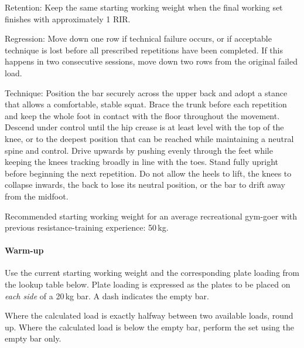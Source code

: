 \documentclass[11pt,a4paper]{article}
\begin{document}
Retention: Keep the same starting working weight when the final working set finishes with approximately 1 RIR.

Regression: Move down one row if technical failure occurs, or if acceptable technique is lost before all prescribed repetitions have been completed. If this happens in two consecutive sessions, move down two rows from the original failed load.

Technique: Position the bar securely across the upper back and adopt a stance that allows a comfortable, stable squat. Brace the trunk before each repetition and keep the whole foot in contact with the floor throughout the movement. Descend under control until the hip crease is at least level with the top of the knee, or to the deepest position that can be reached while maintaining a neutral spine and control. Drive upwards by pushing evenly through the feet while keeping the knees tracking broadly in line with the toes. Stand fully upright before beginning the next repetition. Do not allow the heels to lift, the knees to collapse inwards, the back to lose its neutral position, or the bar to drift away from the midfoot.

Recommended starting working weight for an average recreational gym-goer with previous resistance-training experience: 50\,kg.

\paragraph{Warm-up}

Use the current starting working weight and the corresponding plate loading from the lookup table below. Plate loading is expressed as the plates to be placed on \emph{each side} of a 20\,kg bar. A dash indicates the empty bar.

Where the calculated load is exactly halfway between two available loads, round up. Where the calculated load is below the empty bar, perform the set using the empty bar only.
\end{document}
